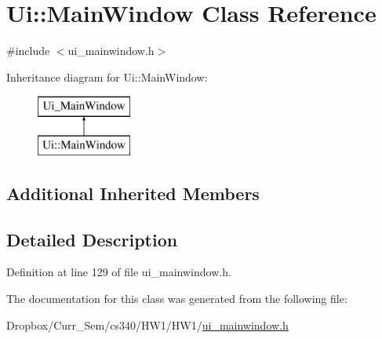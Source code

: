 \hypertarget{class_ui_1_1_main_window}{\section{Ui\-:\-:Main\-Window Class Reference}
\label{class_ui_1_1_main_window}
}


{\ttfamily \#include $<$ui\-\_\-mainwindow.\-h$>$}

Inheritance diagram for Ui\-:\-:Main\-Window\-:\begin{figure}[H]
\begin{center}
\leavevmode
\includegraphics[height=2.000000cm]{class_ui_1_1_main_window}
\end{center}
\end{figure}
\subsection*{Additional Inherited Members}


\subsection{Detailed Description}


Definition at line 129 of file ui\-\_\-mainwindow.\-h.



The documentation for this class was generated from the following file\-:\begin{DoxyCompactItemize}
\item 
Dropbox/\-Curr\-\_\-\-Sem/cs340/\-H\-W1/\-H\-W1/\hyperlink{ui__mainwindow_8h}{ui\-\_\-mainwindow.\-h}\end{DoxyCompactItemize}
